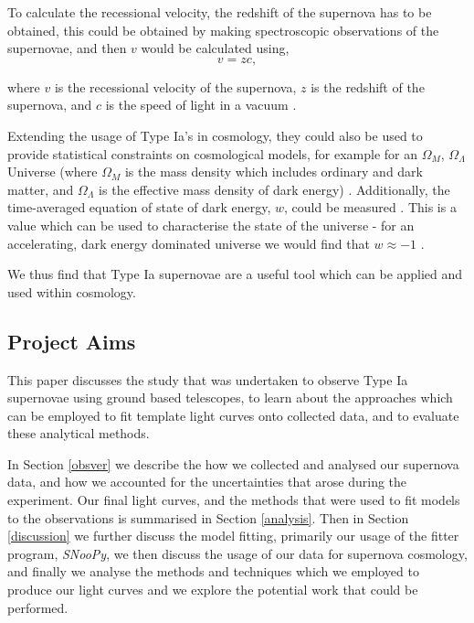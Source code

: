 \documentclass[twocolumn]{revtex4}
\begin{document}
To calculate the recessional velocity, the redshift of the supernova has to be obtained, this could be obtained by making spectroscopic observations of the supernovae, and then $v$ would be calculated using,
 \begin{equation}
v = zc,
\label{redshift}
\end{equation}

where $v$ is the recessional velocity of the supernova, $z$ is the redshift of the supernova, and $c$ is the speed of light in a vacuum \cite{mod_ast}.


Extending the usage of Type Ia's in cosmology, they could also be used to provide statistical constraints on cosmological models, for example for an $\Omega_M$, $\Omega_{\Lambda}$ Universe (where $\Omega_M$ is the mass density which includes ordinary and dark matter, and $\Omega_{\Lambda}$ is the effective mass density of dark energy) \cite{mod_ast, exp_uni_sn}. Additionally, the time-averaged equation of state of dark energy, $w$, could be measured \cite{sn_consts}. This is a value which can be used to characterise the state of the universe - for an accelerating, dark energy dominated universe we would find that $w \approx -1$ \cite{longair}. 

We thus find that Type Ia supernovae are a useful tool which can be applied and used within cosmology.



\vspace{-3ex}
\subsection{Project Aims}
\vspace{-2ex}
This paper discusses the study that was undertaken to observe Type Ia supernovae using ground based telescopes, to learn about the approaches which can be employed to fit template light curves onto collected data, and to evaluate these analytical methods.

In Section \ref{obsver} we describe the how we collected and analysed our supernova data, and how we accounted for the uncertainties that arose during the experiment. Our final light curves, and the methods that were used to fit models to the observations is summarised in Section \ref{analysis}. Then in Section \ref{discussion} we further discuss the model fitting, primarily our usage of the fitter program, \textit{SNooPy}, we then discuss the usage of our data for supernova cosmology, and finally we analyse the methods and techniques which we employed to produce our light curves and we explore the potential work that could be performed.
\end{document}
